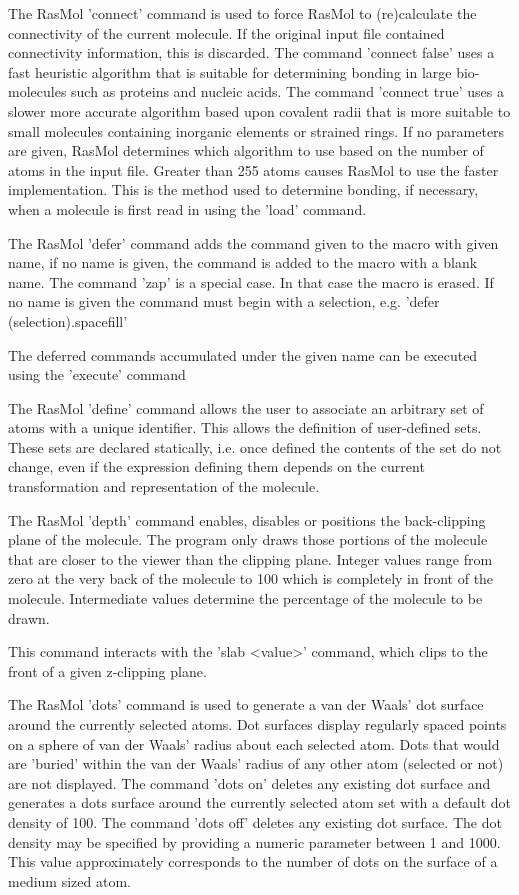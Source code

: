 The RasMol
'connect'
command is used to force RasMol to (re)calculate the connectivity
of the current molecule.
If the original input file contained connectivity information, this
is discarded. The command
'connect false'
uses a fast heuristic
algorithm that is suitable for determining bonding in large
bio-molecules such as proteins and nucleic acids. The command
'connect true'
uses a slower more accurate algorithm based upon
covalent radii that is more suitable to small molecules containing
inorganic elements or strained rings. If no parameters are given,
RasMol determines which algorithm to use based on the number of atoms
in the input file. Greater than 255 atoms causes RasMol to use the
faster implementation. This is the method used to determine bonding,
if necessary, when a molecule is first read in using the
'load'
command.

The RasMol
'defer'
command adds the command given to the macro with given name,
if no name is given, the command is added to the macro with a
blank name. The command
'zap'
is a special case. In that case the macro is erased. If no name is
given the command must begin with a selection, e.g.
'defer (selection).spacefill'

The deferred commands accumulated under the given name can be executed
using the
'execute'
command

The RasMol
'define'
command allows the user to associate an arbitrary set of atoms with a
unique identifier. This allows the definition of user-defined sets. These
sets are declared statically, i.e. once defined the contents of the set
do not change, even if the expression defining them depends on the
current transformation and representation of the molecule.

The RasMol
'depth'
command enables, disables or positions the back-clipping plane of the
molecule. The program only draws those portions of the
molecule that are closer to the viewer than the clipping plane.
Integer values range from zero at the very back of the molecule to
100 which is completely in front of the molecule. Intermediate values
determine the percentage of the molecule to be drawn.

This command interacts with the
'slab <value>'
command, which clips to the front of a given z-clipping plane.

The RasMol
'dots'
command is used to generate a van der Waals' dot surface around the
currently selected atoms. Dot surfaces display regularly spaced points
on a sphere of van der Waals' radius about each selected atom. Dots that
would are 'buried' within the van der Waals' radius of any other atom
(selected or not) are not displayed.
The command
'dots on'
deletes any existing dot surface and generates a dots surface around
the currently selected atom set with a default dot density of 100. The
command
'dots off'
deletes any existing dot surface. The dot density may be
specified by providing a numeric parameter between 1 and 1000. This
value approximately corresponds to the number of dots on the surface
of a medium sized atom.


